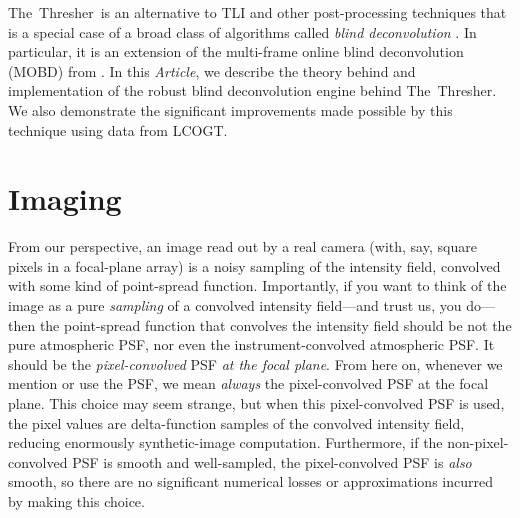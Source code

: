 \documentclass[12pt,preprint]{aastex}
\newcommand{\project}[1]{{\sffamily #1}}
\newcommand{\TheThresher}{\project{The~Thresher}}
\newcommand{\LCOGT}{\project{LCOGT}}
\newcommand{\documentname}{\textsl{Article}}
\newcommand{\sectlabel}[1]{\label{sect:#1}}
\begin{document}
\TheThresher\ is an alternative to TLI and other post-processing
techniques that is a special case of a broad class of algorithms
called \emph{blind deconvolution} \citep{ayers}. In particular, it
is an extension of the multi-frame online blind deconvolution (MOBD)
from \citet{hirsch}. In this \documentname, we describe the theory
behind and implementation of the robust blind deconvolution engine
behind \TheThresher. We also demonstrate the significant improvements
made possible by this technique using data from \LCOGT.

\section{Imaging} \sectlabel{imaging}

From our perspective, an image read out by a real camera (with, say,
square pixels in a focal-plane array) is a noisy sampling of the
intensity field, convolved with some kind of point-spread function.
Importantly, if you want to think of the image as a pure
\emph{sampling} of a convolved intensity field---and trust us, you
do---then the point-spread function that convolves the intensity field
should be not the pure atmospheric PSF, nor even the
instrument-convolved atmospheric PSF\@.  It should be the
\emph{pixel-convolved} PSF \emph{at the focal plane}.  From here on,
whenever we mention or use the PSF, we mean \emph{always} the
pixel-convolved PSF at the focal plane.  This choice may seem strange,
but when this pixel-convolved PSF is used, the pixel values are
delta-function samples of the convolved intensity field, reducing
enormously synthetic-image computation.  Furthermore, if the
non-pixel-convolved PSF is smooth and well-sampled, the
pixel-convolved PSF is \emph{also} smooth, so there are no significant
numerical losses or approximations incurred by making this choice.

\end{document}
